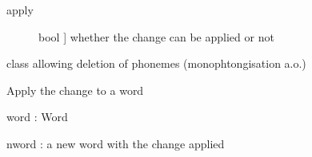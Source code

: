 \documentclass[letterpaper,10pt,english]{sphinxmanual}
\begin{document}
\begin{fulllineitems}
\begin{fulllineitems}
\begin{description}
\end{description}
\begin{description}
\item[{apply}] \leavevmode{[}bool {]}
\sphinxAtStartPar
whether the change can be applied or not

\end{description}

\end{fulllineitems}


\end{fulllineitems}


\begin{fulllineitems}
\label{\detokenize{index:Change.D_change}}
\sphinxAtStartPar
class allowing deletion of phonemes (monophtongisation a.o.)

\begin{fulllineitems}
\label{\detokenize{index:Change.D_change.apply_word}}
\sphinxAtStartPar
Apply the change to a word

\sphinxAtStartPar
word : Word

\sphinxAtStartPar
nword : a new word with the change applied

\end{fulllineitems}


\end{fulllineitems}

\end{document}

